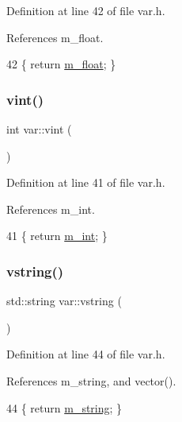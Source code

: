 Definition at line 42 of file var.\+h.



References m\+\_\+float.


\begin{DoxyCode}
42 \{ \textcolor{keywordflow}{return} \hyperlink{classvar_adb803c54ed2edb812a77241d511385e6}{m\_float}; \}
\end{DoxyCode}
\mbox{\label{classvar_a84535a30ae85f19acb935fcc98a03abf}} 
\subsubsection{\texorpdfstring{vint()}{vint()}}
{\footnotesize\ttfamily int var\+::vint (\begin{DoxyParamCaption}{ }\end{DoxyParamCaption})\hspace{0.3cm}{\ttfamily [inline]}}



Definition at line 41 of file var.\+h.



References m\+\_\+int.


\begin{DoxyCode}
41 \{ \textcolor{keywordflow}{return} \hyperlink{classvar_a2796c70baa395a5e2c5457df760249d7}{m\_int}; \}
\end{DoxyCode}
\mbox{\label{classvar_ada169cb1305db45a1de31071ce5033e2}} 
\subsubsection{\texorpdfstring{vstring()}{vstring()}}
{\footnotesize\ttfamily std\+::string var\+::vstring (\begin{DoxyParamCaption}{ }\end{DoxyParamCaption})\hspace{0.3cm}{\ttfamily [inline]}}



Definition at line 44 of file var.\+h.



References m\+\_\+string, and vector().


\begin{DoxyCode}
44 \{ \textcolor{keywordflow}{return} \hyperlink{classvar_a81567a7f3af11ceee9a0624648e0e904}{m\_string}; \}
\end{DoxyCode}
\mbox{\label{classvar_a56b3d498264760e7b1212d204e6a49d4}} 
